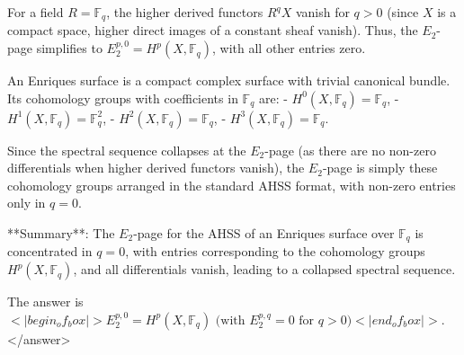For a field \( R = \mathbb{F}_q \), the higher derived functors \( R^q X \) vanish for \( q > 0 \) (since \( X \) is a compact space, higher direct images of a constant sheaf vanish). Thus, the \( E_2 \)-page simplifies to \( E_2^{p,0} = H^p(X, \mathbb{F}_q) \), with all other entries zero.  

An Enriques surface is a compact complex surface with trivial canonical bundle. Its cohomology groups with coefficients in \( \mathbb{F}_q \) are:  
- \( H^0(X, \mathbb{F}_q) = \mathbb{F}_q \),  
- \( H^1(X, \mathbb{F}_q) = \mathbb{F}_q^2 \),  
- \( H^2(X, \mathbb{F}_q) = \mathbb{F}_q \),  
- \( H^3(X, \mathbb{F}_q) = \mathbb{F}_q \).  

Since the spectral sequence collapses at the \( E_2 \)-page (as there are no non-zero differentials when higher derived functors vanish), the \( E_2 \)-page is simply these cohomology groups arranged in the standard AHSS format, with non-zero entries only in \( q = 0 \).  

**Summary**: The \( E_2 \)-page for the AHSS of an Enriques surface over \( \mathbb{F}_q \) is concentrated in \( q = 0 \), with entries corresponding to the cohomology groups \( H^p(X, \mathbb{F}_q) \), and all differentials vanish, leading to a collapsed spectral sequence.  

The answer is \(<|begin_of_box|>E_2^{p,0} = H^p(X, \mathbb{F}_q) \text{ (with } E_2^{p,q} = 0 \text{ for } q > 0\text{)}<|end_of_box|>\).</answer>